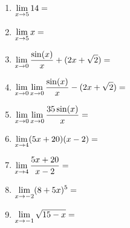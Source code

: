 \documentclass[11pt,fleqn]{article}
\begin{document}
\begin{enumerate}
\item \hfill $\displaystyle \lim_{x \to 5} 14 = \hspace{1in}$\\
\vfill
\item \hfill $\displaystyle \lim_{x \to 5} x = \hspace{1in}$\\
\vfill

\item \hfill $\displaystyle \lim_{x \to 0}\frac{\sin(x)}{x} +(2x+\sqrt{2})  = \hspace{1in}$\\
\vfill

\item \hfill $\displaystyle \lim_{x \to 0 } \lim_{x \to 0}\frac{\sin(x)}{x} -(2x+\sqrt{2}) = \hspace{1in}$\\
\vfill

\item \hfill $\displaystyle \lim_{x \to 0 }   \lim_{x \to 0}\frac{35\sin(x)}{x}= \hspace{1in}$\\
\vfill
\item \hfill $\displaystyle \lim_{x \to 4} (5x+20)(x-2) = \hspace{1in}$\\
\vfill
\item \hfill $\displaystyle \lim_{x \to 4}   \frac{5x+20}{x-2}= \hspace{1in}$\\
\vfill
\item \hfill $\displaystyle \lim_{x \to -2}  (8+5x)^5= \hspace{1in}$\\
\vfill
\item \hfill $\displaystyle \lim_{x \to -1} \sqrt{15-x} = \hspace{1in}$\\
\vfill


\end{enumerate}
\end{document}
